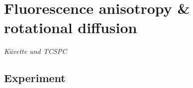 

\chapter{Fluorescence anisotropy \& rotational diffusion}

\textit{Küvette und TCSPC
}
\section{Experiment}

 




\printbibliography[segment=\therefsegment,heading=subbibliography]
